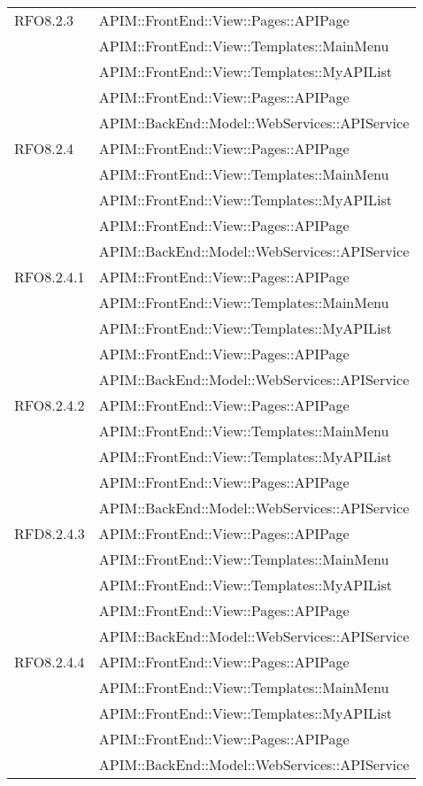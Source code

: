 \begin{longtable}{ p{4cm} | p{12cm} }
\hline RFO8.2.3
& APIM::FrontEnd::View::Pages::APIPage \\
& APIM::FrontEnd::View::Templates::MainMenu \\
& APIM::FrontEnd::View::Templates::MyAPIList \\
& APIM::FrontEnd::View::Pages::APIPage \\
& APIM::BackEnd::Model::WebServices::APIService \\

\hline RFO8.2.4
& APIM::FrontEnd::View::Pages::APIPage \\
& APIM::FrontEnd::View::Templates::MainMenu \\
& APIM::FrontEnd::View::Templates::MyAPIList \\
& APIM::FrontEnd::View::Pages::APIPage \\
& APIM::BackEnd::Model::WebServices::APIService \\

\hline RFO8.2.4.1
& APIM::FrontEnd::View::Pages::APIPage \\
& APIM::FrontEnd::View::Templates::MainMenu \\
& APIM::FrontEnd::View::Templates::MyAPIList \\
& APIM::FrontEnd::View::Pages::APIPage \\
& APIM::BackEnd::Model::WebServices::APIService \\

\hline RFO8.2.4.2
& APIM::FrontEnd::View::Pages::APIPage \\
& APIM::FrontEnd::View::Templates::MainMenu \\
& APIM::FrontEnd::View::Templates::MyAPIList \\
& APIM::FrontEnd::View::Pages::APIPage \\
& APIM::BackEnd::Model::WebServices::APIService \\

\hline RFD8.2.4.3
& APIM::FrontEnd::View::Pages::APIPage \\
& APIM::FrontEnd::View::Templates::MainMenu \\
& APIM::FrontEnd::View::Templates::MyAPIList \\
& APIM::FrontEnd::View::Pages::APIPage \\
& APIM::BackEnd::Model::WebServices::APIService \\

\hline RFO8.2.4.4
& APIM::FrontEnd::View::Pages::APIPage \\
& APIM::FrontEnd::View::Templates::MainMenu \\
& APIM::FrontEnd::View::Templates::MyAPIList \\
& APIM::FrontEnd::View::Pages::APIPage \\
& APIM::BackEnd::Model::WebServices::APIService \\


\end{longtable}

